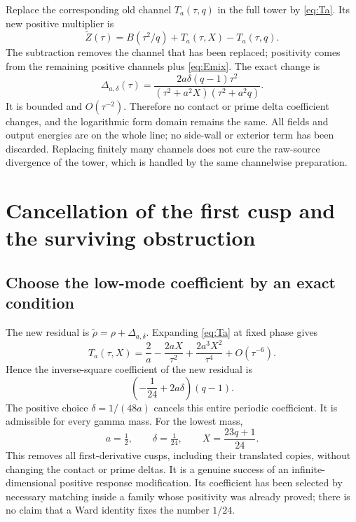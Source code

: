 \documentclass[11pt]{article}
\numberwithin{equation}{section}
\theoremstyle{definition}
\theoremstyle{remark}
\begin{document}
Replace the corresponding old channel $T_a(\tau,q)$ in the full tower by \eqref{eq:Ta}. Its new positive multiplier is
\begin{equation}
 \widetilde Z(\tau)=B(\tau^2/q)+T_a(\tau,X)-T_a(\tau,q).
 \label{eq:Ztilde}
\end{equation}
The subtraction removes the channel that has been replaced; positivity comes from the remaining positive channels plus \eqref{eq:Emix}. The exact change is
\begin{equation}
 \Delta_{a,\delta}(\tau)=
 \frac{2a\delta(q-1)\tau^2}
 {(\tau^2+a^2X)(\tau^2+a^2q)}.
 \label{eq:Delta}
\end{equation}
It is bounded and $O(\tau^{-2})$. Therefore no contact or prime delta coefficient changes, and the logarithmic form domain remains the same. All fields and output energies are on the whole line; no side-wall or exterior term has been discarded. Replacing finitely many channels does not cure the raw-source divergence of the tower, which is handled by the same channelwise preparation.

\section{Cancellation of the first cusp and the surviving obstruction}
\label{sec:thirdjump}
\subsection{Choose the low-mode coefficient by an exact condition}
The new residual is $\widetilde\rho=\rho+\Delta_{a,\delta}$. Expanding \eqref{eq:Ta} at fixed phase gives
\begin{equation}
 T_a(\tau,X)=\frac2a-\frac{2aX}{\tau^2}
                       +\frac{2a^3X^2}{\tau^4}+O(\tau^{-6}).
\end{equation}
Hence the inverse-square coefficient of the new residual is
\begin{equation}
 \left(-\frac1{24}+2a\delta\right)(q-1).
 \label{eq:cancel2}
\end{equation}
The positive choice $\delta=1/(48a)$ cancels this entire periodic coefficient. It is admissible for every gamma mass. For the lowest mass,
\begin{equation}
 a=\tfrac12,\qquad \delta=\tfrac1{24},\qquad
 X=\frac{23q+1}{24}.
 \label{eq:choice}
\end{equation}
This removes all first-derivative cusps, including their translated copies, without changing the contact or prime deltas. It is a genuine success of an infinite-dimensional positive response modification. Its coefficient has been selected by necessary matching inside a family whose positivity was already proved; there is no claim that a Ward identity fixes the number $1/24$.
\end{document}
